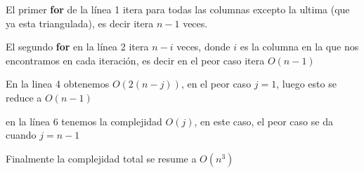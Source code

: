 \documentclass{article}
\begin{document}
El primer \textbf{for} de la línea 1 itera para todas las columnas excepto la ultima (que ya esta triangulada), es decir itera $n-1$ veces.

El segundo \textbf{for} en la línea 2 itera $n-i$ veces, donde $i$ es la columna en la que nos encontramos en cada iteración, es decir en el peor caso itera $O(n-1)$

En la linea 4 obtenemos $O(2(n-j))$, en el peor caso $j=1$, luego esto se reduce a $O(n-1)$

en la línea 6 tenemos la complejidad $O(j)$, en este caso, el peor caso se da cuando $j=n-1$

Finalmente la complejidad total se resume a $O(n^3)$
\end{document}
